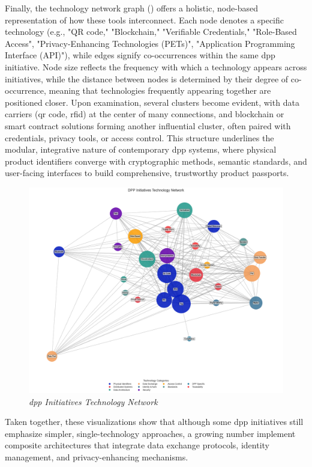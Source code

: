 Finally, the technology network graph () offers a holistic, node-based representation of how these tools interconnect. Each node denotes a specific technology (e.g., "QR code," "Blockchain," "Verifiable Credentials," "Role-Based Access", "Privacy-Enhancing Technologies (PETs)", "Application Programming Interface (API)"), while edges signify co-occurrences within the same \ac{dpp} initiative. Node size reflects the frequency with which a technology appears across initiatives, while the distance between nodes is determined by their degree of co-occurrence, meaning that technologies frequently appearing together are positioned closer. Upon examination, several clusters become evident, with data carriers (\ac{qr} code, \ac{rfid}) at the center of many connections, and blockchain or smart contract solutions forming another influential cluster, often paired with credentials, privacy tools, or access control. This structure underlines the modular, integrative nature of contemporary \ac{dpp} systems, where physical product identifiers converge with cryptographic methods, semantic standards, and user-facing interfaces to build comprehensive, trustworthy product passports.

\begin{figure}[!ht]
  \centering
  \includegraphics[width=\textwidth]{figures/initiatives_tech_network.png}
  \caption{%
    \textit{\ac{dpp} Initiatives Technology Network} 
  }
  \label{fig:initiatives_tech_network}
\end{figure}

Taken together, these visualizations show that although some \ac{dpp} initiatives still emphasize simpler, single-technology approaches, a growing number implement composite architectures that integrate data exchange protocols, identity management, and privacy-enhancing mechanisms.
